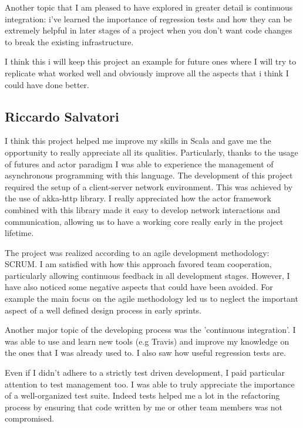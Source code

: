 Another topic that I am pleased to have explored in greater detail is continuous integration: i've learned the importance of regression tests and how they can be extremely helpful in later stages of a project when you don't want code changes to break the existing infrastructure.

I think this i will keep this project an example for future ones where I will try to replicate what worked well and
obviously improve all the aspects that i think I could have done better.




\subsection{Riccardo Salvatori}

I think this project helped me improve my skills in Scala and gave me the opportunity to really appreciate all its qualities. Particularly, thanks to the usage of futures and actor paradigm I was able to experience the management of asynchronous programming with this language. 
The development of this project required the setup of a client-server network environment. 
This was achieved by the use of akka-http library. I really appreciated how the actor framework combined with this library made it easy to develop network interactions and communication, allowing us to have a working core really early in the project lifetime.

The project was realized according to an agile development methodology: SCRUM. 
I am satisfied with how this approach favored team cooperation, particularly allowing continuous feedback in all development stages. 
However, I have also noticed some negative aspects that could have been avoided. For example the main focus on the agile methodology led us to neglect the important aspect of a well defined design process in early sprints.

Another major topic of the developing process was the 'continuous integration'. 
 I was able to use and learn new tools (e.g Travis) and improve my knowledge on the ones that I was already used to.  I also saw how useful regression tests are.
 
Even if I didn't adhere to a strictly test driven development, I paid particular attention to test management too. 
I was able to truly appreciate the importance of a well-organized test suite. Indeed tests helped me a lot in the refactoring process by ensuring that code written by me or other team members was not compromised.

